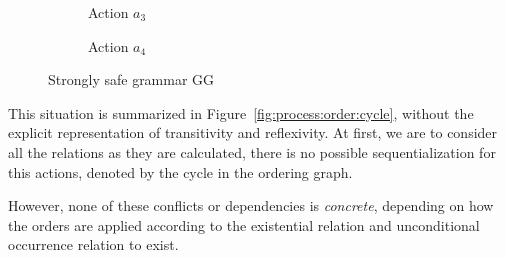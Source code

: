 \begin{example}
\begin{figure}[!ht]
  \begin{subfigure}[t]{.5\textwidth}
    \centerline{}
    \caption{Action $a_3$}\label{fig:process:order:a3}
  \end{subfigure}%
  \begin{subfigure}[t]{.5\textwidth}
    \centerline{}
    \caption{Action $a_4$}\label{fig:process:order:a4}
  \end{subfigure}
  \caption{Strongly safe grammar GG}\label{fig:process:order}
\end{figure}


  This situation is summarized in Figure~\ref{fig:process:order:cycle}, without the explicit representation of transitivity and reflexivity. At first, we are to consider all the relations as they are calculated, there is no possible sequentialization for this actions, denoted by the cycle in the ordering graph.

  However, none of these conflicts or dependencies is \emph{concrete}, depending on how the orders are applied according to the existential relation and unconditional occurrence relation to exist.


\end{example}
